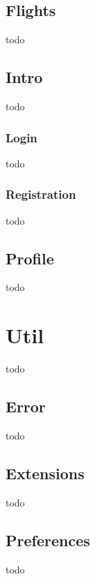 \subsection{Flights}
todo

\subsection{Intro}
todo

\subsubsection{Login}
todo

\subsubsection{Registration}
todo

\subsection{Profile}
todo

\section{Util}
todo

\subsection{Error}
todo

\subsection{Extensions}
todo

\subsection{Preferences}
todo
